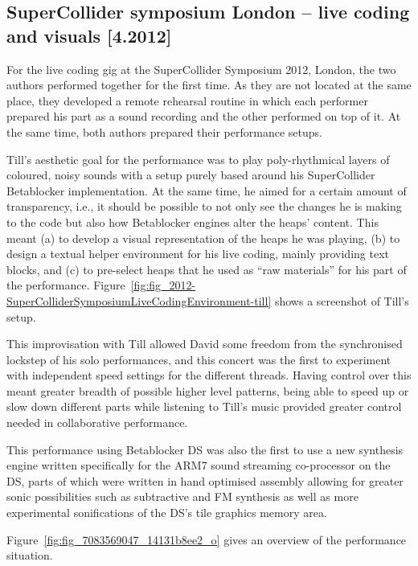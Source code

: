 \documentclass[letterpaper, 12pt]{article}
\begin{document}
\subsection{SuperCollider symposium London -- live coding and visuals [4.2012]}
\label{sub:livecoding_and_visuals}

For the live coding gig at the SuperCollider Symposium 2012, London, the two authors performed together for the first time.
As they are not located at the same place, they developed a remote rehearsal routine in which each performer prepared his part as a sound recording and the other performed on top of it.
At the same time, both authors prepared their performance setups.

Till's aesthetic goal for the performance was to play poly-rhythmical layers of coloured, noisy sounds with a setup purely based around his SuperCollider Betablocker implementation.
At the same time, he aimed for a certain amount of transparency, i.e., it should be possible to not only see the changes he is making to the code but also how  Betablocker engines alter the heaps' content.
This meant
(a) to develop a visual representation of the heaps he was playing,
(b) to design a textual helper environment for his live coding, mainly providing text blocks, and
(c) to pre-select heaps that he used as ``raw materials'' for his part of the  performance.
Figure~\ref{fig:fig_2012-SuperColliderSymposiumLiveCodingEnvironment-till} shows a screenshot of Till's setup.


This improvisation with Till allowed David some freedom from the synchronised lockstep of his solo performances, and this concert was the first to experiment with independent speed settings for the different threads. Having control over this meant greater breadth of possible higher level patterns, being able to speed up or slow down different parts while listening to Till's music provided greater control needed in collaborative performance.

This performance using Betablocker DS was also the first to use a new synthesis engine written specifically for the ARM7 sound streaming co-processor on the DS, parts of which were written in hand optimised assembly allowing for greater sonic possibilities such as subtractive and FM synthesis as well as more experimental sonifications of the DS's tile graphics memory area.

Figure~\ref{fig:fig_7083569047_14131b8ee2_o} gives an overview of the performance situation.
\end{document}
